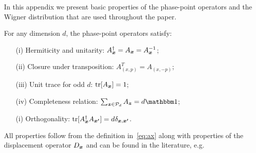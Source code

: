 \documentclass[pra,
aps,
twocolumn,
superscriptaddress,
groupedaddress,
nofootinbib,
reprint
]{revtex4-1}
\begin{document}
In this appendix we present basic properties of the phase-point operators and the Wigner distribution that are used throughout the paper.

\begin{proposition}\label{thm:aproperties}
    For any dimension $d$, the phase-point operators satisfy:
    \begin{enumerate}
        \item[(i)]\label{en:a1} Hermiticity and unitarity: $A_{\bm{x}}^\dagger = A_{\bm{x}} = A_{\bm{x}}^{-1}$;
	    \item[(ii)]\label{en:a2} Closure under transposition: $A_{(x, p)}^T = A_{(x, -p)}$;
	    \item[(iii)]\label{en:a3} Unit trace for odd $d$: $\mbox{tr}[A_{\bm{x}}] = 1$;
	    \item[(iv)]\label{en:a4} Completeness relation: $\sum_{\bmz \in \cal{P}_d} A_{\bmz} = d\id$;
	    \item[(i)]\label{en:a5} Orthogonality: $\mbox{tr}[A_{\bm{x}}^\dagger A_{\bm{x'}}] = d \delta_{\bm{x},\bm{x'}}$.
	\end{enumerate}
\end{proposition}
All properties follow from the definition in~\cref{eq:ax} along with properties of the displacement operator $D_{\bm{x}}$ and can be found in the literature, e.g.~\cite{cit:veitch,Vourdas_2004,cit:gross3}
\end{document}

